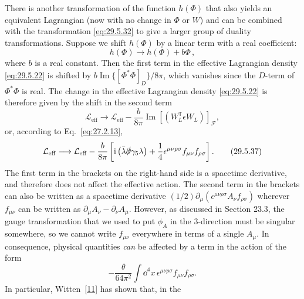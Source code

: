 There is another transformation of the function \(h(\Phi)\) that also yields
an equivalent Lagrangian (now with no change in \(\Phi\) or \(W\)) and can be
combined with the transformation \eqref{eq:29.5.32} to give a larger group of
duality transformations. Suppose we shift \(h(\Phi)\) by a linear term with
a real coefficient:
\begin{equation}
  h(\Phi)\longrightarrow h(\Phi)+b\Phi\,,
  \tag{29.5.35}\label{eq:29.5.35}
\end{equation}
where \(b\) is a real constant. Then the first term in the effective
Lagrangian density \eqref{eq:29.5.22} is shifted by
\(b\operatorname{Im}\{[\Phi^*\Phi]_D\}/8\pi\), which vanishes since the
\(D\)-term of \(\Phi^*\Phi\) is real. The change in the effective Lagrangian
density \eqref{eq:29.5.22} is therefore given by the shift in the second term
\begin{equation}
  \mathcal{L}_{\mathrm{eff}}\longrightarrow\mathcal{L}_{\mathrm{eff}}
  -\frac{b}{8\pi}\operatorname{Im}
    \left[\left(W_L^{\mathsf T}\epsilon W_L\right)\right]_{\mathcal F},
  \tag{29.5.36}\label{eq:29.5.36}
\end{equation}
or, according to Eq.~\eqref{eq:27.2.13},
\begin{equation}
  \mathcal{L}_{\mathrm{eff}}\longrightarrow\mathcal{L}_{\mathrm{eff}}
  -\frac{b}{8\pi}\left[
    \mathrm{i}\left(\bar\lambda\slashed{\partial}\gamma_5\lambda\right)
    +\frac14\epsilon^{\mu\nu\rho\sigma}f_{\mu\nu}f_{\rho\sigma}
  \right].
  \tag{29.5.37}\label{eq:29.5.37}
\end{equation}
The first term in the brackets on the right-hand side is a spacetime
derivative, and therefore does not affect the effective action. The second
term in the brackets can also be written as a spacetime derivative
\((1/2)\partial_\mu(\epsilon^{\mu\nu\rho\sigma}A_\nu f_{\rho\sigma})\)
wherever \(f_{\mu\nu}\) can be written as
\(\partial_\mu A_\nu-\partial_\nu A_\mu\). However, as discussed in Section
23.3, the gauge transformation that we used to put \(\phi_A\) in the
3-direction must be singular somewhere, so we cannot write \(f_{\mu\nu}\)
everywhere in terms of a single \(A_\mu\). In consequence, physical
quantities \textit{can} be affected by a term in the action of the form
\begin{equation}
  -\frac{\theta}{64\pi^2}\int \dd^4x\,
    \epsilon^{\mu\nu\rho\sigma}f_{\mu\nu}f_{\rho\sigma}.
  \tag{29.5.38}\label{eq:29.5.38}
\end{equation}
In particular, Witten~\hyperref[ch29-ref-11]{[11]} has shown that, in the
